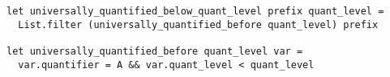 \begin{lstlisting}[language=caml, label=trivialdepschemeimpl]
let universally_quantified_below_quant_level prefix quant_level =
  List.filter (universally_quantified_before quant_level) prefix

let universally_quantified_before quant_level var =
  var.quantifier = A && var.quant_level < quant_level
\end{lstlisting}
